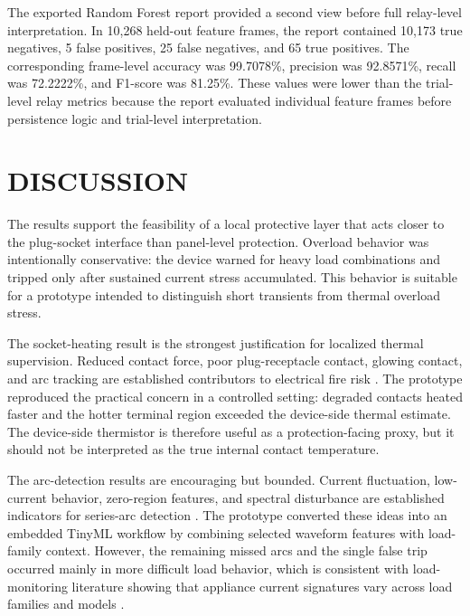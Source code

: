 \documentclass[twocolumn,twoside]{base/ajstd}
\begin{document}
The exported Random Forest report provided a second view before full relay-level interpretation. In 10,268 held-out feature frames, the report contained 10,173 true negatives, 5 false positives, 25 false negatives, and 65 true positives. The corresponding frame-level accuracy was 99.7078\%, precision was 92.8571\%, recall was 72.2222\%, and F1-score was 81.25\%. These values were lower than the trial-level relay metrics because the report evaluated individual feature frames before persistence logic and trial-level interpretation.

\section{DISCUSSION}

The results support the feasibility of a local protective layer that acts closer to the plug-socket interface than panel-level protection. Overload behavior was intentionally conservative: the device warned for heavy load combinations and tripped only after sustained current stress accumulated. This behavior is suitable for a prototype intended to distinguish short transients from thermal overload stress.

The socket-heating result is the strongest justification for localized thermal supervision. Reduced contact force, poor plug-receptacle contact, glowing contact, and arc tracking are established contributors to electrical fire risk \citep{Hadziefendic2018ReducedTorque,Hadziefendic2019PoorContacts,Zhang2023GlowingContact,Okamoto2022ArcTracking}. The prototype reproduced the practical concern in a controlled setting: degraded contacts heated faster and the hotter terminal region exceeded the device-side thermal estimate. The device-side thermistor is therefore useful as a protection-facing proxy, but it should not be interpreted as the true internal contact temperature.

The arc-detection results are encouraging but bounded. Current fluctuation, low-current behavior, zero-region features, and spectral disturbance are established indicators for series-arc detection \citep{Zhao2022SeriesArc,Gong2022SeriesArc,Chen2024LightweightArc,Qi2024SeriesArcELM}. The prototype converted these ideas into an embedded TinyML workflow by combining selected waveform features with load-family context. However, the remaining missed arcs and the single false trip occurred mainly in more difficult load behavior, which is consistent with load-monitoring literature showing that appliance current signatures vary across load families and models \citep{Medico2020PLAID,Shareef2023NILM}.
\end{document}
